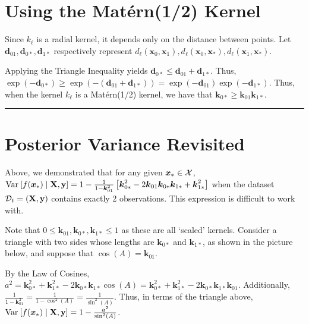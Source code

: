 \documentclass[11pt]{article}
\numberwithin{figure}{section}
\numberwithin{equation}{section}
\newcommand{\bs}[1]{\boldsymbol{#1}}
\def\bsx{\bs{x}}
\def\bsk{\bs{k}}
\def\bsd{\bs{d}}
\def\bell{\bs{\ell}}
\def\xast{\bsx_{*}}
\def\Matern{\textrm{Mat\'{e}rn}}
\begin{document}
\newpage 

\section{Using the \Matern(1/2) Kernel}

Since $k_{\bell}$ is a radial kernel, it depends only on the distance between points. Let $\bsd_{01}, \bsd_{0*}, \bsd_{1*}$ respectively represent $d_{\bell}(\bsx_{0}, \bsx_{1}), d_{\bell}(\bsx_{0}, \xast), d_{\bell}(\bsx_{1}, \xast)$. 

Applying the Triangle Inequality yields $\bsd_{0*} \le \bsd_{01} + \bsd_{1*}$. Thus, $\exp(-\bsd_{0*}) \ge \exp\left(-\left(\bsd_{01} + \bsd_{1*}\right)\right) = \exp(-\bsd_{01})\exp(-\bsd_{1*})$. Thus, when the kernel $k_{\bell}$ is a \Matern(1/2) kernel, we have that $\bsk_{0*} \ge \bsk_{01}\bsk_{1*}$.
\noindent\rule{\textwidth}{0.8pt}

\section{Posterior Variance Revisited}
Above, we demonstrated that for any given $\xast \in \calX$, $\var{f(\xast) \mid \mathbf{X}, \mathbf{y}} = 1 - \frac{1}{1 - \bsk_{01}^{2}}\left[\bsk_{0*}^{2} - 2\bsk_{01}\bsk_{0*}\bsk_{1*} + \bsk_{1*}^{2}\right]$ when the dataset $\mathcal{D}_{t} = (\mathbf{X}, \mathbf{y})$ contains exactly 2 observations. This expression is difficult to work with.

Note that $0 \le \bsk_{01}, \bsk_{0*}, \bsk_{1*} \le 1$ as these are all `scaled' kernels. Consider a triangle with two sides whose lengths are $\bsk_{0*}$ and $\bsk_{1*}$, as shown in the picture below, and suppose that $\cos(A) = \bsk_{01}$.

\vspace*{1.0cm}
\begin{center}
\end{center}

By the Law of Cosines, $a^2 = \bsk_{0*}^2 + \bsk_{1*}^{2} - 2\bsk_{0*}\bsk_{1*}\cos(A) = \bsk_{0*}^2 + \bsk_{1*}^{2} - 2\bsk_{0*}\bsk_{1*}\bsk_{01}$. Additionally, $\frac{1}{1 - \bsk_{01}^{2}} = \frac{1}{1 - \cos^{2}(A)} = \frac{1}{\sin^{2}(A)}$. Thus, in terms of the triangle above, $\var{f(\xast) \mid \mathbf{X}, \mathbf{y}} = 1 - \frac{a^2}{\sin^2(A)}$.
\end{document}
